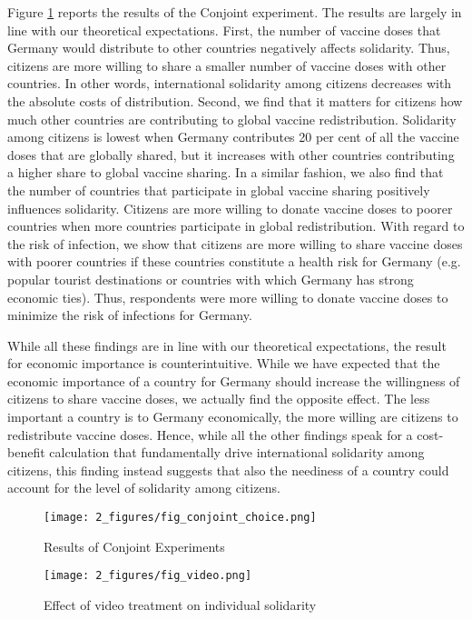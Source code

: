 \documentclass[12pt,oneside,smallheadings,chapterprefix=true]{article}
\begin{document}
Figure \ref{fig:conjoint_choice} reports the results of the Conjoint experiment. The results are largely in line with our theoretical expectations. First, the number of vaccine doses that Germany would distribute to other countries negatively affects solidarity. Thus, citizens are more willing to share a smaller number of vaccine doses with other countries. In other words, international solidarity among citizens decreases with the absolute costs of distribution. Second, we find that it matters for citizens how much other countries are contributing to global vaccine redistribution. Solidarity among citizens is lowest when Germany contributes 20 per cent of all the vaccine doses that are globally shared, but it increases with other countries contributing a higher share to global vaccine sharing. In a similar fashion, we also find that the number of countries that participate in global vaccine sharing positively influences solidarity. Citizens are more willing to donate vaccine doses to poorer countries when more countries participate in global redistribution. With regard to the risk of infection, we show that citizens are more willing to share vaccine doses with poorer countries if these countries constitute a health risk for Germany (e.g. popular tourist destinations or countries with which Germany has strong economic ties). Thus, respondents were more willing to donate vaccine doses to minimize the risk of infections for Germany. 

While all these findings are in line with our theoretical expectations, the result for economic importance is counterintuitive. While we have expected that the economic importance of a country for Germany should increase the willingness of citizens to share vaccine doses, we actually find the opposite effect. The less important a country is to Germany economically, the more willing are citizens to redistribute vaccine doses. Hence, while all the other findings speak for a cost-benefit calculation that fundamentally drive international solidarity among citizens, this finding instead suggests that also the neediness of a country could account for the level of solidarity among citizens. 

\begin{figure}[hbt!]
\texttt{[image: 2\_figures/fig\_conjoint\_choice.png]}
\caption{Results of Conjoint Experiments}
\label{fig:conjoint_choice}
\end{figure}

\begin{figure}[hbt!]
\texttt{[image: 2\_figures/fig\_video.png]}
\caption{Effect of video treatment on individual solidarity}
\label{fig:video}
\end{figure}
\end{document}

